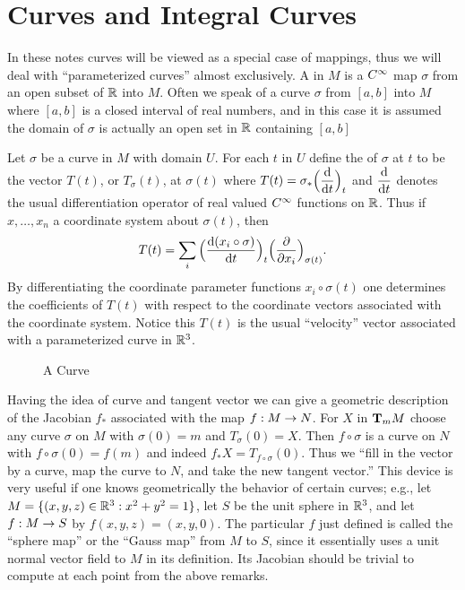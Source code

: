 \documentclass[../main]{subfiles}
\begin{document}
\section{Curves and Integral Curves}\label{ch01:s5}

In these notes curves will be viewed as a special case of mappings, thus we will deal with ``parameterized curves'' almost exclusively. A  in $M$ is a $\CInfty$ map $\sigma$ from an open subset of $\bR$ into $M$. Often we speak of a curve $\sigma$ from $[a, b]$ into $M$ where $[a, b]$ is a closed interval of real numbers, and in this case it is assumed the domain of $\sigma$ is actually an open set in $\bR$ containing $[a, b]$

Let $\sigma$ be a curve in $M$ with domain $U$. For each $t$ in $U$ define the  of $\sigma$ at $t$ to be the vector $T(t)$, or $T_\sigma(t)$, at $\sigma(t)$ where $T(t)=\sigma_*\Big(\dv{}{t}\Big)_t$ and $\dv{}{t}$ denotes the usual differentiation operator of real valued $\CInfty$ functions on $\bR$. Thus if $x,\dots,x_n$ a coordinate system about $\sigma(t)$, then \[T(t)=\sum_i\Big(\dv{(x_i\circ \sigma)}{t}\Big)_t\Big(\pdv{}{x_i}\Big)_{\sigma(t)}.\] By differentiating the coordinate parameter functions $x_i\circ\sigma(t)$ one determines the coefficients of $T(t)$ with respect to the coordinate vectors associated with the coordinate system. Notice this $T(t)$ is the usual ``velocity'' vector associated with a parameterized curve in $\bR^3$.

\begin{figure}[ht]
    \centering
    \caption{A Curve}
    \label{fig:a-curve}
\end{figure}


Having the idea of curve and tangent vector we can give a geometric description of the Jacobian $f_*$ associated with the map $f: M \functionMaps N$. For $X$ in $\tangentspace{M}{m}$ choose any curve $\sigma$ on $M$ with $\sigma(0)=m$ and $T_\sigma(0)=X$. Then $f \circ \sigma$ is a curve on $N$ with $f \circ \sigma(0)=f(m)$ and indeed $f_*X=T_{f \circ \sigma}(0)$. Thus we ``fill in the vector by a curve, map the curve to $N$, and take the new tangent vector.'' This device is very useful if one knows geometrically the behavior of certain curves; e.g., let $M=\{(x, y, z) \in \bR^3:x^2+y^2=1\}$, let $S$ be the unit sphere in $\bR^3$, and let $f: M \functionMaps S$ by $f(x, y, z)=(x, y, 0)$. The particular $f$ just defined is called the ``sphere map'' or the ``Gauss map'' from $M$ to $S$, since it essentially uses a unit normal vector field to $M$ in its definition. Its Jacobian should be trivial to compute at each point from the above remarks.
\end{document}
